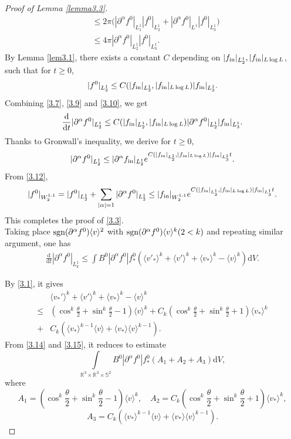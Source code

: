 \documentclass[reqno,10pt]{amsart}
\let\pa=\partial
\let\al=\alpha
\def\pa{\partial}
\def\th{\theta}
\newcommand{\beq}{\begin{equation}}
\newcommand{\eeq}{\end{equation}}
\newcommand{\ben}{\begin{eqnarray}}
\newcommand{\een}{\end{eqnarray}}
\newcommand{\beno}{\begin{eqnarray*}}
\newcommand{\eeno}{\end{eqnarray*}}
\theoremstyle{definition}
\numberwithin{equation}{section}
\begin{document}
\begin{proof}[Proof of Lemma \ref{lemma3.3}]
\begin{equation}
\begin{aligned}
    &\le 2\pi\Big(|\pa^{\al}f^{0}|_{L^1_1}|f^0|_{L^1_2}+|\pa^{\al}f^{0}|_{L^1}|f^0|_{L^1_3} \Big)\\
    &\le 4\pi |\pa^{\al}f^{0}|_{L^1_2}|f^0|_{L^1_3}.
    \end{aligned}
    \end{equation}
    By Lemma \ref{lem3.1}, there exists a constant $C$ depending on $|f_{\textup{in}}|_{L^1_2},|f_{\textup{in}}|_{L\log L}$, such that for $t\ge0$,
    \ben\label{3.10}
|f^0|_{L^1_3}\le C(|f_{\textup{in}}|_{L^1_2},|f_{\textup{in}}|_{L\log L})|f_{\textup{in}}|_{L^1_3}.
    \een
    Combining \eqref{3.7}, \eqref{3.9} and \eqref{3.10}, we get
    \beno
\frac{\mathrm{d}}{\mathrm{d}t}|\pa^{\al}f^{0}|_{L^1_2}\le C(|f_{\textup{in}}|_{L^1_2},|f_{\textup{in}}|_{L\log L})|\pa^{\al}f^{0}|_{L^1_2}|f_{\textup{in}}|_{L^1_3}.
    \eeno
    Thanks to Gronwall's inequality, we derive for $t\ge 0$,
    \ben\label{3.12}
|\pa^{\al}f^{0}|_{L^1_2}\le |\pa^{\al}f_{\textup{in}}|_{L^1_2}e^{C(|f_{\textup{in}}|_{L^1_2},|f_{\textup{in}}|_{L\log L})|f_{\textup{in}}|_{L^1_3}t}.
    \een
    From \eqref{3.12}, 
    \beno
|f^0|_{W^{1,1}_2}= |f^0|_{L^1_2}+ \sum\limits_{|\al|=1}|\pa^{\al}f^{0}|_{L^1_2}\le |f_{\textup{in}}|_{W^{1,1}_2}e^{C(|f_{\textup{in}}|_{L^1_2},|f_{\textup{in}}|_{L\log L})|f_{\textup{in}}|_{L^1_3}t}.
    \eeno
    This completes the proof of \eqref{3.3}.\\ 
    Taking place $\textup{sgn}(\pa^{\al}f^0)\langle v\rangle^2$ with $\textup{sgn}(\pa^{\al}f^0)\langle v\rangle^{k}(2< k)$ and repeating similar argument, one has
    \ben\label{3.14}
    \frac{\mathrm{d}}{\mathrm{d}t}|\pa ^{\al}f^0|_{L^1_{k}}\le\int B^0|\pa^{\al}f^{0}|f^0_*(\langle v'_*\rangle^{k}+\langle v'\rangle^{k}+\langle v_*\rangle^{k}-\langle v\rangle^{k})\mathrm{d}V.
    \een
    
   
    By \eqref{3.1}, it gives
    \beq\label{3.15}
    \begin{aligned}
        &\langle v_*'\rangle^{k}+\langle v'\rangle^{k}+\langle v_*\rangle^{k}-\langle v\rangle^{k}\\
        \le& (\cos^{k}\frac{\th}{2}+\sin^{k}\frac{\th}{2}-1)\langle v\rangle^{k}+C_k(\cos^{k}\frac{\th}{2}+\sin^{k}\frac{\th}{2}+1)\langle v_*\rangle^{k}
        \\
        +&C_k(\langle v_*\rangle^{k-1}\langle v\rangle+\langle v_*\rangle\langle v\rangle^{k-1}).
    \end{aligned}
    \eeq
    From \eqref{3.14} and \eqref{3.15}, it reduces to estimate
    $$\int\limits_{\mathbb{R}^3\times\mathbb{R}^3\times\mathbb{S}^2}B^0|\pa^{\al}f^{0}|f^0_*(A_1+A_2+A_3)\mathrm{d}V,$$
    where 
    $$A_1=(\cos^{k}\frac{\th}{2}+\sin^{k}\frac{\th}{2}-1)\langle v\rangle^{k},\quad A_2=C_k(\cos^{k}\frac{\th}{2}+\sin^{k}\frac{\th}{2}+1)\langle v_*\rangle^{k},$$
    $$A_3=C_k(\langle v_*\rangle^{k-1}\langle v\rangle+\langle v_*\rangle\langle v\rangle^{k-1}).$$
   

\end{proof}
\end{document}
